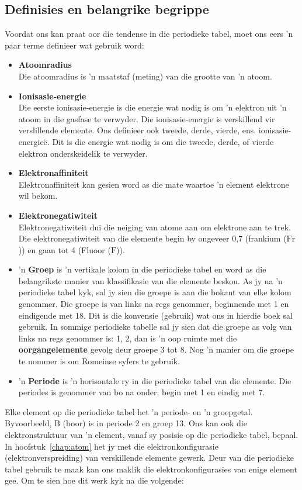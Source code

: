 \subsection*{Definisies en belangrike begrippe}
Voordat ons kan praat oor die tendense in die periodieke tabel, moet ons eers 'n paar terme definieer wat gebruik word:
\begin{itemize}[noitemsep]
\item \textbf{Atoomradius} \\
Die atoomradius is 'n maatstaf (meting) van die grootte van 'n atoom. 
\item \textbf{Ionisasie-energie}\\
Die eerste ionisasie-energie is die energie wat nodig is om 'n elektron uit 'n atoom in die gasfase te verwyder. Die ionisasie-energie is verskillend vir verslillende elemente. Ons definieer ook tweede, derde, vierde, ens. ionisasie-energie\"{e}. Dit is die energie wat nodig is om die tweede, derde, of vierde elektron onderskeidelik te verwyder. 
\item \textbf{Elektronaffiniteit}\\
Elektronaffiniteit kan gesien word as die mate waartoe 'n element elektrone wil bekom.
\item \textbf{Elektronegatiwiteit}\\
Elektronegatiwiteit dui die neiging van atome aan om elektrone aan te trek. Die elektronegatiwiteit van die elemente begin by ongeveer 0,7 (frankium ($\text{Fr}$)) en gaan tot 4 (Fluoor ($\text{F}$)).
\item 'n \textbf{Groep} is 'n vertikale kolom in die periodieke tabel en word as die belangrikste manier van klassifikasie van die elemente beskou. As jy na 'n periodieke tabel kyk, sal jy sien die groepe is aan die bokant van elke kolom genommer. Die groepe is van links na regs genommer, beginnende met 1 en eindigende met 18. Dit is die konvensie (gebruik) wat ons in hierdie boek sal gebruik. In sommige periodieke tabelle sal jy sien dat die groepe as volg van links na regs genommer is: 1, 2, dan is 'n oop ruimte met die \textbf{oorgangelemente} gevolg deur groepe 3 tot 8. Nog 'n manier om die groepe te nommer  is om Romeinse syfers te gebruik.
\item 'n \textbf{Periode} is 'n horisontale ry in die periodieke tabel van die elemente. Die periodes is genommer van bo na onder; begin met 1 en eindig met 7.
\end{itemize}
Elke element op die periodieke tabel het  'n periode- en  'n groepgetal. Byvoorbeeld, $\text{B}$ (boor) is in periode 2 en groep 13. Ons kan ook die elektronstruktuur van 'n element, vanaf sy posisie op die periodieke tabel, bepaal. In hoofstuk~\ref{chap:atom} het jy met die elektronkonfigurasie (elektronverspreiding) van verskillende elemente gewerk. Deur van die periodieke tabel gebruik te maak kan ons maklik die elektronkonfigurasies van enige element gee. Om te sien hoe dit werk kyk na die volgende:\\
